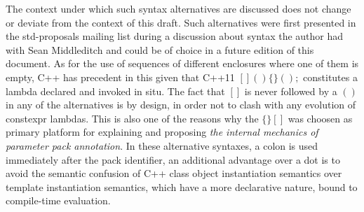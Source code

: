 \p The context under which such syntax alternatives are discussed does not change or deviate from the context of this draft.
Such alternatives were first presented in the std-proposals mailing list during a discussion about syntax the author had with Sean Middleditch and could be of choice in a future edition of this document.
As for the use of sequences of different enclosures where one of them is empty, C++ has precedent in this given that C++11 $\bm{[]()\{\}();}$ constitutes a lambda declared and invoked in situ.
The fact that $\bm{[]}$ is never followed by a $\bm{()}$ in any of the alternatives is by design, in order not to clash with any evolution of constexpr lambdas.
This is also one of the reasons why the $\bm{\{\}[]}$ was choosen as primary platform for explaining and proposing \textit{the internal mechanics of parameter pack annotation}.
In these alternative syntaxes, a colon is used immediately after the pack identifier, an additional advantage over a dot is to avoid the semantic confusion of C++ class object instantiation semantics over template instantiation semantics, which have a more declarative nature, bound to compile-time evaluation.
